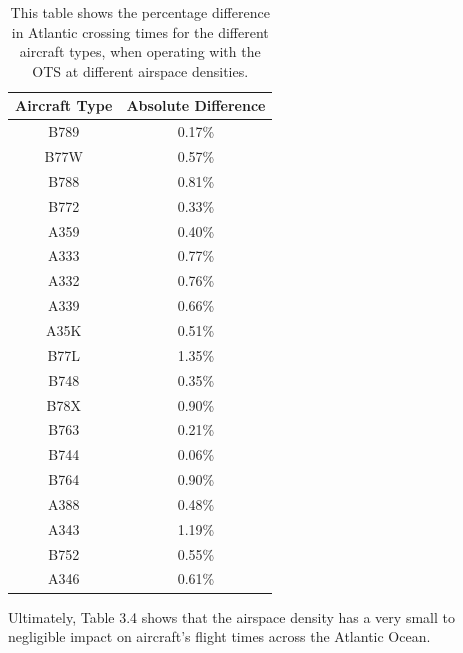 \documentclass[stu, a4paper, 12pt, floatsintext]{apa7}
\numberwithin{figure}{section}
\numberwithin{table}{section}
\numberwithin{equation}{section}
\begin{document}
\begin{table}[H]
    \centering
    \caption{This table shows the percentage difference in Atlantic crossing times for the different aircraft types, when operating with the OTS at different airspace densities.}
    \label{tab:34}
    \begin{tabular}{@{}cc@{}}
    \toprule
    \textbf{Aircraft Type} & \textbf{Absolute Difference} \\ \midrule
    B789                   & 0.17\%                       \\
    B77W                   & 0.57\%                       \\
    B788                   & 0.81\%                       \\
    B772                   & 0.33\%                       \\
    A359                   & 0.40\%                       \\
    A333                   & 0.77\%                       \\
    A332                   & 0.76\%                       \\
    A339                   & 0.66\%                       \\
    A35K                   & 0.51\%                       \\
    B77L                   & 1.35\%                       \\
    B748                   & 0.35\%                       \\
    B78X                   & 0.90\%                       \\
    B763                   & 0.21\%                       \\
    B744                   & 0.06\%                       \\
    B764                   & 0.90\%                       \\
    A388                   & 0.48\%                       \\
    A343                   & 1.19\%                       \\
    B752                   & 0.55\%                       \\
    A346                   & 0.61\%                       \\ \bottomrule
    \end{tabular}
\end{table}

Ultimately, Table 3.4 shows that the airspace density has a very small to negligible impact on aircraft’s flight times across the Atlantic Ocean.
\end{document}
